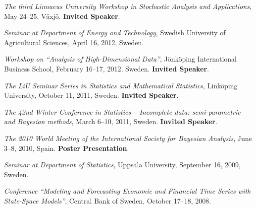 \documentclass[twoside,a4paper]{article}
\begin{document}
\begin{etaremune}[itemsep=0ex,parsep=0pt]
\item \textit{The third Linnaeus University Workshop in Stochastic Analysis and Applications}, May 24--25, Växjö. \textbf{Invited Speaker}.

\item \textit{Seminar at Department of Energy and Technology}, Swedish University of Agricultural Sciences, April 16, 2012, Sweden.

\item \textit{Workshop on ``Analysis of High-Dimensional Data''}, Jönköping International Business School, February 16--17, 2012, Sweden. \textbf{Invited Speaker}.

\item \textit{The LiU Seminar Series in Statistics and Mathematical Statistics}, Linköping University, October 11, 2011, Sweden. \textbf{Invited Speaker}.

\item \textit{The 42nd Winter Conference in Statistics -- Incomplete data: semi-parametric and Bayesian methods}, March 6--10, 2011, Sweden. \textbf{Invited Speaker}.

\item \textit{The 2010 World Meeting of the International Society for Bayesian Analysis}, June 3--8, 2010, Spain. \textbf{Poster Presentation}.

\item \textit{Seminar at Department of Statistics}, Uppsala University, September 16, 2009, Sweden.

\item \textit{Conference ``Modeling and Forecasting Economic and Financial Time Series with State-Space Models''}, Central Bank of Sweden, October 17--18, 2008.

\end{etaremune}
\end{document}
